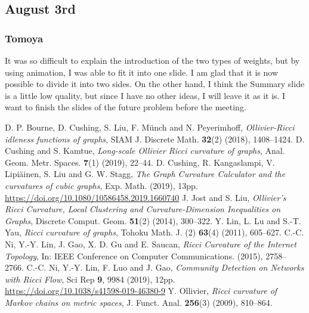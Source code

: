 \documentclass{article}
\numberwithin{equation}{section}
\theoremstyle{definition}
\begin{document}
\subsection{August 3rd}
\subsubsection*{Tomoya}

It was so difficult to explain the introduction of the two types of weights, but by using animation, I was able to fit it into one slide.
I am glad that it is now possible to divide it into two sides.
On the other hand, I think the Summary slide is a little low quality, but since I have no other ideas, I will leave it as it is.
I want to finish the slides of the future problem before the meeting.



\begin{thebibliography}{CKLLS}
 D. P. Bourne, D. Cushing, S. Liu, F. M\"{u}nch and N. Peyerimhoff, \textit{Ollivier-Ricci idleness functions of graphs}, SIAM J. Discrete Math. \textbf{32}(2) (2018), 1408--1424.
 D. Cushing and S. Kamtue, \textit{Long-scale Ollivier Ricci curvature of graphs}, Anal. Geom. Metr. Spaces. \textbf{7}(1) (2019), 22--44. 
 D. Cushing, R. Kangaslampi, V. Lipi\"{a}inen, S. Liu and G. W. Stagg, \textit{The Graph Curvature Calculator and the curvatures of cubic graphs}, Exp. Math. (2019), 13pp. \\
\url{https://doi.org/10.1080/10586458.2019.1660740}
 J. Jost and S. Liu, \textit{Ollivier's Ricci Curvature, Local Clustering and Curvature-Dimension Inequalities on Graphs},  Discrete Comput. Geom. \textbf{51}(2) (2014), 300--322.
 Y. Lin, L. Lu and S.-T. Yau, \textit{Ricci curvature of graphs}, Tohoku Math. J. (2) \textbf{63}(4) (2011), 605--627.
 C.-C. Ni, Y.-Y. Lin, J. Gao, X. D. Gu and E. Saucan, \textit{Ricci Curvature of the Internet Topology}, In: IEEE Conference on Computer Communications. (2015), 2758--2766.
 C.-C. Ni, Y.-Y. Lin, F. Luo and J. Gao, \textit{Community Detection on Networks with Ricci Flow}, Sci Rep \textbf{9}, 9984 (2019), 12pp. \\
\url{https://doi.org/10.1038/s41598-019-46380-9}
  Y. Ollivier, \textit{Ricci curvature of Markov chains on metric spaces}, J. Funct. Anal. \textbf{256}(3) (2009), 810--864.
\end{thebibliography}
\end{document}
